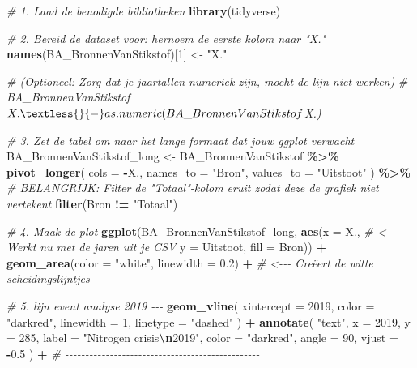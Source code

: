 \documentclass[
]{article}
\newenvironment{Shaded}{\begin{snugshade}}{\end{snugshade}}
\newcommand{\AttributeTok}[1]{\textcolor[rgb]{0.13,0.29,0.53}{#1}}
\newcommand{\CommentTok}[1]{\textcolor[rgb]{0.56,0.35,0.01}{\textit{#1}}}
\newcommand{\DecValTok}[1]{\textcolor[rgb]{0.00,0.00,0.81}{#1}}
\newcommand{\FloatTok}[1]{\textcolor[rgb]{0.00,0.00,0.81}{#1}}
\newcommand{\FunctionTok}[1]{\textcolor[rgb]{0.13,0.29,0.53}{\textbf{#1}}}
\newcommand{\NormalTok}[1]{#1}
\newcommand{\OtherTok}[1]{\textcolor[rgb]{0.56,0.35,0.01}{#1}}
\newcommand{\SpecialCharTok}[1]{\textcolor[rgb]{0.81,0.36,0.00}{\textbf{#1}}}
\newcommand{\StringTok}[1]{\textcolor[rgb]{0.31,0.60,0.02}{#1}}
\begin{document}
\begin{Shaded}
\begin{Highlighting}[]
\CommentTok{\# 1. Laad de benodigde bibliotheken}
\FunctionTok{library}\NormalTok{(tidyverse)}

\CommentTok{\# 2. Bereid de dataset voor: hernoem de eerste kolom naar "X."}
\FunctionTok{names}\NormalTok{(BA\_BronnenVanStikstof)[}\DecValTok{1}\NormalTok{] }\OtherTok{\textless{}{-}} \StringTok{"X."}

\CommentTok{\# (Optioneel: Zorg dat je jaartallen numeriek zijn, mocht de lijn niet werken)}
\CommentTok{\# BA\_BronnenVanStikstof$X. \textless{}{-} as.numeric(BA\_BronnenVanStikstof$X.)}

\CommentTok{\# 3. Zet de tabel om naar het lange formaat dat jouw ggplot verwacht}
\NormalTok{BA\_BronnenVanStikstof\_long }\OtherTok{\textless{}{-}}\NormalTok{ BA\_BronnenVanStikstof }\SpecialCharTok{\%\textgreater{}\%}
  \FunctionTok{pivot\_longer}\NormalTok{(}
    \AttributeTok{cols =} \SpecialCharTok{{-}}\NormalTok{X., }
    \AttributeTok{names\_to =} \StringTok{"Bron"}\NormalTok{, }
    \AttributeTok{values\_to =} \StringTok{"Uitstoot"}
\NormalTok{  ) }\SpecialCharTok{\%\textgreater{}\%}
  \CommentTok{\# BELANGRIJK: Filter de "Totaal"{-}kolom eruit zodat deze de grafiek niet vertekent}
  \FunctionTok{filter}\NormalTok{(Bron }\SpecialCharTok{!=} \StringTok{"Totaal"}\NormalTok{)}


\CommentTok{\# 4. Maak de plot}
\FunctionTok{ggplot}\NormalTok{(BA\_BronnenVanStikstof\_long,}
       \FunctionTok{aes}\NormalTok{(}\AttributeTok{x =}\NormalTok{ X.,                                    }\CommentTok{\# \textless{}{-}{-}{-} Werkt nu met de jaren uit je CSV}
           \AttributeTok{y =}\NormalTok{ Uitstoot, }
           \AttributeTok{fill =}\NormalTok{ Bron)) }\SpecialCharTok{+}
  \FunctionTok{geom\_area}\NormalTok{(}\AttributeTok{color =} \StringTok{"white"}\NormalTok{, }\AttributeTok{linewidth =} \FloatTok{0.2}\NormalTok{) }\SpecialCharTok{+}       \CommentTok{\# \textless{}{-}{-}{-} Creëert de witte scheidingslijntjes}
  
  \CommentTok{\# 5. lijn event analyse 2019 {-}{-}{-}}
  \FunctionTok{geom\_vline}\NormalTok{(}
  \AttributeTok{xintercept =} \DecValTok{2019}\NormalTok{,}
  \AttributeTok{color =} \StringTok{"darkred"}\NormalTok{,}
  \AttributeTok{linewidth =} \DecValTok{1}\NormalTok{,}
  \AttributeTok{linetype =} \StringTok{"dashed"}
\NormalTok{) }\SpecialCharTok{+}
\FunctionTok{annotate}\NormalTok{(}
  \StringTok{"text"}\NormalTok{,}
  \AttributeTok{x =} \DecValTok{2019}\NormalTok{,}
  \AttributeTok{y =} \DecValTok{285}\NormalTok{,}
  \AttributeTok{label =} \StringTok{"Nitrogen crisis}\SpecialCharTok{\textbackslash{}n}\StringTok{2019"}\NormalTok{,}
  \AttributeTok{color =} \StringTok{"darkred"}\NormalTok{,}
  \AttributeTok{angle =} \DecValTok{90}\NormalTok{,}
  \AttributeTok{vjust =} \SpecialCharTok{{-}}\FloatTok{0.5}
\NormalTok{) }\SpecialCharTok{+}
  \CommentTok{\# {-}{-}{-}{-}{-}{-}{-}{-}{-}{-}{-}{-}{-}{-}{-}{-}{-}{-}{-}{-}{-}{-}{-}{-}{-}{-}{-}{-}{-}{-}{-}{-}{-}{-}{-}{-}{-}{-}{-}{-}{-}{-}{-}{-}{-}{-}{-}{-}}
  

\end{Highlighting}
\end{Shaded}
\end{document}

